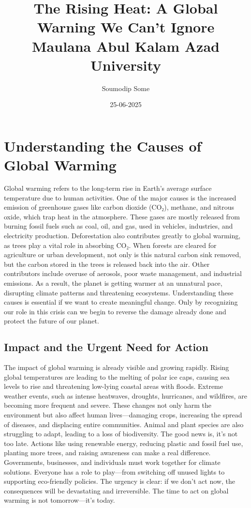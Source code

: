 \documentclass[12pt]{article}
\title{\textbf{The Rising Heat: A Global Warning We Can’t Ignore} \\[1ex]
\large Maulana Abul Kalam Azad University}
\author{Soumodip Some}
\date{25-06-2025}
\begin{document}
\maketitle
\centering
\section{\centering Understanding the Causes of Global Warming}

Global warming refers to the long-term rise in Earth’s average surface temperature due to human activities. One of the major causes is the increased emission of greenhouse gases like carbon dioxide (CO₂), methane, and nitrous oxide, which trap heat in the atmosphere. These gases are mostly released from burning fossil fuels such as coal, oil, and gas, used in vehicles, industries, and electricity production. Deforestation also contributes greatly to global warming, as trees play a vital role in absorbing CO₂. When forests are cleared for agriculture or urban development, not only is this natural carbon sink removed, but the carbon stored in the trees is released back into the air. Other contributors include overuse of aerosols, poor waste management, and industrial emissions. As a result, the planet is getting warmer at an unnatural pace, disrupting climate patterns and threatening ecosystems. Understanding these causes is essential if we want to create meaningful change. Only by recognizing our role in this crisis can we begin to reverse the damage already done and protect the future of our planet.
\begin{center}
    

\section{\centering Impact and the Urgent Need for Action}

The impact of global warming is already visible and growing rapidly. Rising global temperatures are leading to the melting of polar ice caps, causing sea levels to rise and threatening low-lying coastal areas with floods. Extreme weather events, such as intense heatwaves, droughts, hurricanes, and wildfires, are becoming more frequent and severe. These changes not only harm the environment but also affect human lives—damaging crops, increasing the spread of diseases, and displacing entire communities. Animal and plant species are also struggling to adapt, leading to a loss of biodiversity. The good news is, it’s not too late. Actions like using renewable energy, reducing plastic and fossil fuel use, planting more trees, and raising awareness can make a real difference. Governments, businesses, and individuals must work together for climate solutions. Everyone has a role to play—from switching off unused lights to supporting eco-friendly policies. The urgency is clear: if we don’t act now, the consequences will be devastating and irreversible. The time to act on global warming is not tomorrow—it’s today.
\end{center}
\end{document}
